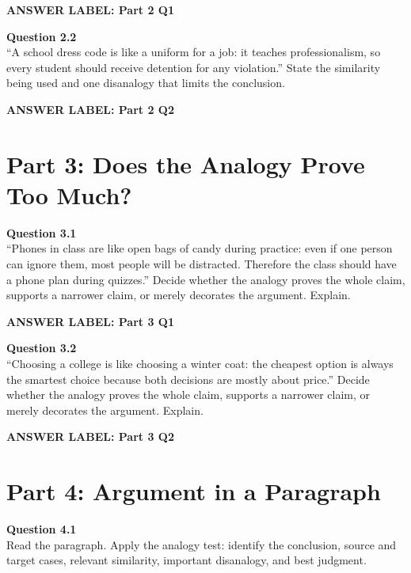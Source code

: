 \documentclass[12pt]{article}
\newcommand{\answerbox}[2]{%
\vspace{0.15em}
\noindent\textbf{#1}\par
\vspace{0.05em}
\noindent\fbox{%
\begin{minipage}[t][#2]{\dimexpr\textwidth-2\fboxsep-2\fboxrule}
\rule{\textwidth}{0pt}
\vspace{#2}
\end{minipage}
}\par
\vspace{0.25em}
}
\begin{document}
\answerbox{ANSWER LABEL: Part 2 Q1}{2.5in}

\textbf{Question 2.2}\\[-0.15em]
``A school dress code is like a uniform for a job: it teaches professionalism, so every student should receive detention for any violation.'' State the similarity being used and one disanalogy that limits the conclusion.

\answerbox{ANSWER LABEL: Part 2 Q2}{2.55in}

\newpage

\section*{Part 3: Does the Analogy Prove Too Much?}

\textbf{Question 3.1}\\[-0.15em]
``Phones in class are like open bags of candy during practice: even if one person can ignore them, most people will be distracted. Therefore the class should have a phone plan during quizzes.'' Decide whether the analogy proves the whole claim, supports a narrower claim, or merely decorates the argument. Explain.

\answerbox{ANSWER LABEL: Part 3 Q1}{2.75in}

\textbf{Question 3.2}\\[-0.15em]
``Choosing a college is like choosing a winter coat: the cheapest option is always the smartest choice because both decisions are mostly about price.'' Decide whether the analogy proves the whole claim, supports a narrower claim, or merely decorates the argument. Explain.

\answerbox{ANSWER LABEL: Part 3 Q2}{2.75in}

\newpage

\section*{Part 4: Argument in a Paragraph}

\textbf{Question 4.1}\\[-0.15em]
Read the paragraph. Apply the analogy test: identify the conclusion, source and target cases, relevant similarity, important disanalogy, and best judgment.

\vspace{0.2em}

\noindent{}
\end{document}
